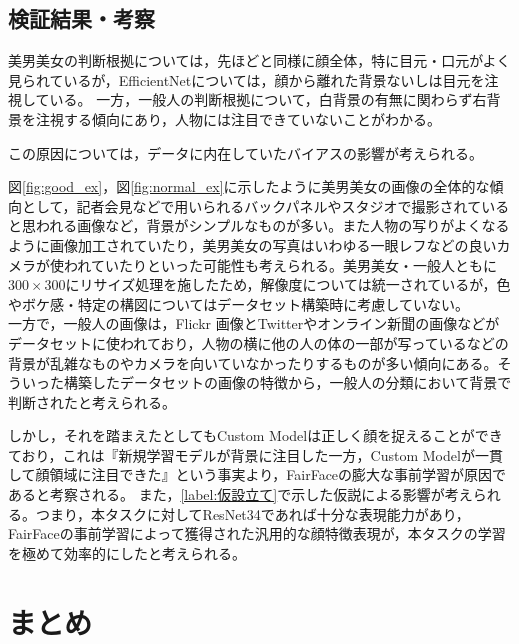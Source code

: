 \documentclass[a4paper,11pt,titlepage]{jsarticle}
\begin{document}
\subsection{検証結果・考察}
\label{label:検証結果・考察}

美男美女の判断根拠については，先ほどと同様に顔全体，特に目元・口元がよく見られているが，EfficientNetについては，顔から離れた背景ないしは目元を注視している。
一方，一般人の判断根拠について，白背景の有無に関わらず右背景を注視する傾向にあり，人物には注目できていないことがわかる。

この原因については，データに内在していたバイアスの影響が考えられる。\par
図\ref{fig:good_ex}，図\ref{fig:normal_ex}に示したように美男美女の画像の全体的な傾向として，記者会見などで用いられるバックパネルやスタジオで撮影されていると思われる画像など，背景がシンプルなものが多い。また人物の写りがよくなるように画像加工されていたり，美男美女の写真はいわゆる一眼レフなどの良いカメラが使われていたりといった可能性も考えられる。美男美女・一般人ともに$300 \times 300$にリサイズ処理を施したため，解像度については統一されているが，色やボケ感・特定の構図についてはデータセット構築時に考慮していない。\\

一方で，一般人の画像は，Flickr 画像とTwitterやオンライン新聞の画像などがデータセットに使われており，人物の横に他の人の体の一部が写っているなどの背景が乱雑なものやカメラを向いていなかったりするものが多い傾向にある。そういった構築したデータセットの画像の特徴から，一般人の分類において背景で判断されたと考えられる。\par



しかし，それを踏まえたとしてもCustom Modelは正しく顔を捉えることができており，これは『新規学習モデルが背景に注目した一方，Custom Modelが一貫して顔領域に注目できた』という事実より，FairFaceの膨大な事前学習が原因であると考察される。
また，\ref{label:仮設立て}で示した仮説による影響が考えられる。つまり，本タスクに対してResNet34であれば十分な表現能力があり，FairFaceの事前学習によって獲得された汎用的な顔特徴表現が，本タスクの学習を極めて効率的にしたと考えられる。



\section{まとめ}
\label{label:まとめ}
\end{document}
